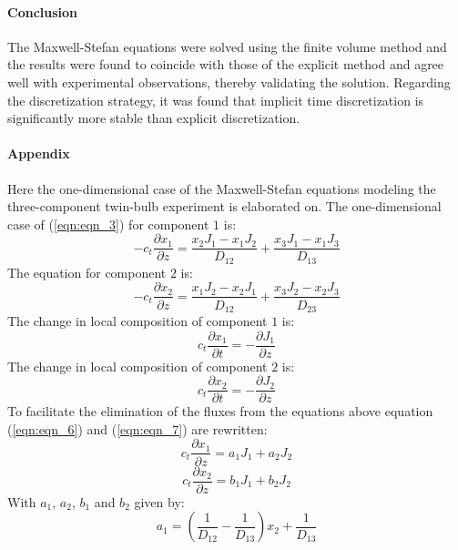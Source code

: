 \documentclass[twocolumn]{article}
\begin{document}
\paragraph*{Conclusion}
The Maxwell-Stefan equations were solved using the finite volume method and the results were found to coincide with those of the explicit method and agree well with experimental observations, thereby validating the solution. Regarding the discretization strategy, it was found that implicit time discretization is significantly more stable than explicit discretization. 

\paragraph*{Appendix}
Here the one-dimensional case of the Maxwell-Stefan equations modeling the three-component twin-bulb experiment is elaborated on. The one-dimensional case of (\ref{eqn:eqn_3}) for component $1$ is:
\begin{equation}
\label{eqn:eqn_6}
-c_t \frac{\partial x_1}{\partial z} = \frac{x_2 J_1 - x_1 J_2}{D_{12}} + \frac{x_3 J_1 - x_1 J_3}{D_{13}}
\end{equation}
The equation for component $2$ is:
\begin{equation}
\label{eqn:eqn_7}
-c_t \frac{\partial x_2}{\partial z} = \frac{x_1 J_2 - x_2 J_1}{D_{12}} + \frac{x_3 J_2 - x_2 J_3}{D_{23}}
\end{equation}
The change in local composition of component $1$ is:
\begin{equation}
\label{eqn:eqn_8}
c_t \frac{\partial x_1}{\partial t} = - \frac{\partial J_1}{\partial z}
\end{equation}
The change in local composition of component $2$ is:
\begin{equation}
\label{eqn:eqn_9}
c_t \frac{\partial x_2}{\partial t} = - \frac{\partial J_2}{\partial z}
\end{equation}
To facilitate the elimination of the fluxes from the equations above equation (\ref{eqn:eqn_6}) and (\ref{eqn:eqn_7}) are rewritten:
\begin{equation}
\label{eqn:eqn_10}
c_t \frac{\partial x_1}{\partial z} = a_1 J_1 + a_2 J_2
\end{equation}
\begin{equation}
\label{eqn:eqn_11}
c_t \frac{\partial x_2}{\partial z} = b_1 J_1 + b_2 J_2
\end{equation}
With $a_1$, $a_2$, $b_1$ and $b_2$ given by:
\begin{equation}
\label{eqn:eqn_12}
a_1 = \left( \frac{1}{D_{12}} - \frac{1}{D_{13}} \right) x_2 + \frac{1}{D_{13}}
\end{equation}
\end{document}
